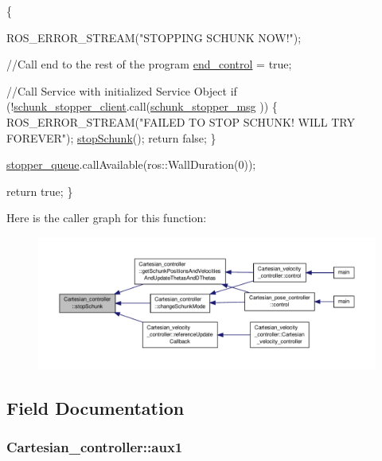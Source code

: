 \begin{DoxyCode}
                                     \{

        ROS\_ERROR\_STREAM(\textcolor{stringliteral}{"STOPPING SCHUNK NOW!"});

        \textcolor{comment}{//Call end to the rest of the program}
        \hyperlink{classCartesian__controller_a3c0a72214891f68e2bad63bf2b688f9c}{end\_control} = \textcolor{keyword}{true};

        \textcolor{comment}{//Call Service with initialized Service Object}
        \textcolor{keywordflow}{if} (!\hyperlink{classCartesian__controller_a4ea7350e0f797c49bc51d3433a761aff}{schunk\_stopper\_client}.call(\hyperlink{classCartesian__controller_a29581ed2f2d8bb97c55e16868bbcc8bd}{schunk\_stopper\_msg}
      ))
        \{
                ROS\_ERROR\_STREAM(\textcolor{stringliteral}{"FAILED TO STOP SCHUNK! WILL TRY FOREVER"});
                \hyperlink{classCartesian__controller_a3ba54e8b35632526c5e8eb2ab5d7de0d}{stopSchunk}();
                \textcolor{keywordflow}{return} \textcolor{keyword}{false};
        \}

        \hyperlink{classCartesian__controller_a52eb090400d8dafaa22aecb037788a66}{stopper\_queue}.callAvailable(ros::WallDuration(0));

        \textcolor{keywordflow}{return} \textcolor{keyword}{true};
\}
\end{DoxyCode}


Here is the caller graph for this function\-:\nopagebreak
\begin{figure}[H]
\begin{center}
\leavevmode
\includegraphics[width=350pt]{classCartesian__controller_a3ba54e8b35632526c5e8eb2ab5d7de0d_icgraph}
\end{center}
\end{figure}




\subsection{Field Documentation}
\hypertarget{classCartesian__controller_a37edb9c6e2a5066f74941e3659f68cbc}{
\subsubsection[{aux1}]{ Cartesian\-\_\-controller\-::aux1\hspace{0.3cm}{\ttfamily [protected]}}}\label{classCartesian__controller_a37edb9c6e2a5066f74941e3659f68cbc}


